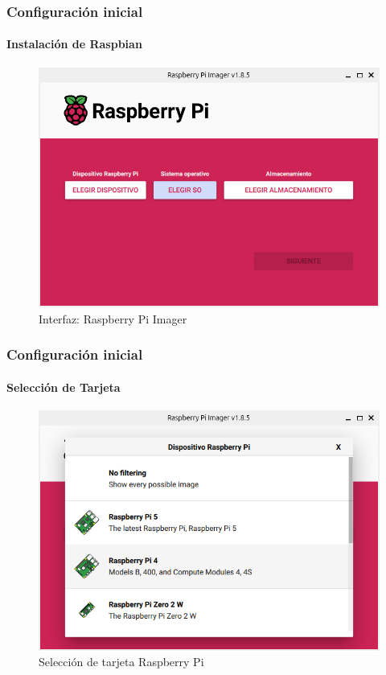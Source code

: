 \documentclass{beamer}
\begin{document}
	\begin{frame}
		\frametitle{Configuración inicial}
		\framesubtitle{Instalación de Raspbian}	
		
		\begin{figure}
			\includegraphics[scale=0.35]{imager.png}
			\caption{Interfaz: Raspberry Pi Imager}
		\end{figure}
		
	\end{frame}
	
	\begin{frame}
		\frametitle{Configuración inicial}
		\framesubtitle{Selección de Tarjeta}
		
		\begin{figure}
			\includegraphics[scale=0.35]{imager2.png}
			\caption{Selección de tarjeta Raspberry Pi}
		\end{figure}
		
	\end{frame}
	
\end{document}
